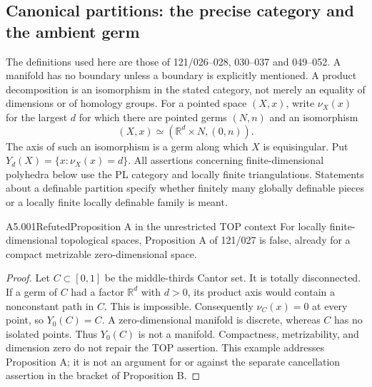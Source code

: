 \subsection{Canonical partitions: the precise category and the ambient germ}
\label{sec:A5}

The definitions used here are those of 121/026--028, 030--037 and
049--052.  A manifold has no boundary unless a boundary is explicitly
mentioned.  A product decomposition is an isomorphism in the stated
category, not merely an equality of dimensions or of homology groups.
For a pointed space $(X,x)$, write $\nu_X(x)$ for the largest $d$ for which
there are pointed germs $(N,n)$ and an isomorphism
\[
 (X,x)\simeq(\mathbb R^d\times N,(0,n)).
\]
The axis of such an isomorphism is a germ along which $X$ is
equisingular.  Put $Y_d(X)=\{x:\nu_X(x)=d\}$.
All assertions concerning finite-dimensional polyhedra below use the
PL category and locally finite triangulations.  Statements about a
definable partition specify whether finitely many globally definable
pieces or a locally finite locally definable family is meant.

\begin{saresult}{A5.001}{Refuted}{Proposition A in the unrestricted TOP context}
For locally finite-dimensional topological spaces, Proposition A of
121/027 is false, already for a compact metrizable zero-dimensional
space.
\end{saresult}
\begin{proof}
Let $C\subset[0,1]$ be the middle-thirds Cantor set.  It is totally
disconnected.  If a germ of $C$ had a factor $\mathbb R^d$ with $d>0$,
its product axis would contain a nonconstant path in $C$.  This is
impossible.  Consequently $\nu_C(x)=0$ at every point, so $Y_0(C)=C$.
A zero-dimensional manifold is discrete, whereas $C$ has no isolated
points.  Thus $Y_0(C)$ is not a manifold.  Compactness, metrizability,
and dimension zero do not repair the TOP assertion.  This example
addresses Proposition A; it is not an argument for or against the
separate cancellation assertion in the bracket of Proposition B.
\end{proof}

